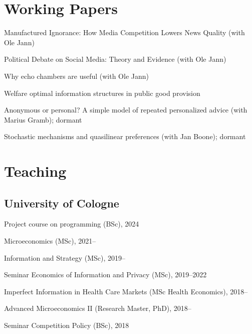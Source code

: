 \documentclass[a4paper]{article}
\renewenvironment{itemize}{
  \begin{list}{}{
    \setlength{\leftmargin}{1.5em}
  }
}{
  \end{list}
}
\begin{document}
\section*{Working Papers}

\begin{itemize}
\item Manufactured Ignorance: How Media Competition Lowers News Quality (with Ole Jann)
  
\item Political Debate on Social Media: Theory and Evidence (with Ole Jann)
  
\item Why echo chambers are useful (with Ole Jann)
  
\item Welfare optimal information structures in public good provision

\item Anonymous or personal? A simple model of repeated personalized advice (with Marius Gramb); dormant
  
\item Stochastic mechanisms and quasilinear preferences (with Jan Boone); dormant
\end{itemize}




\section*{Teaching} 

\subsection*{University of Cologne}
\begin{itemize}
\item Project course on programming (BSc), 2024
\item Microeconomics (MSc), 2021--
\item Information and Strategy (MSc), 2019--
\item Seminar Economics of Information and Privacy (MSc), 2019--2022
\item Imperfect Information in Health Care Markets (MSc Health Economics), 2018--
\item Advanced Microeconomics II (Research Master, PhD), 2018--
\item Seminar Competition Policy (BSc), 2018
\end{itemize}
\end{document}
